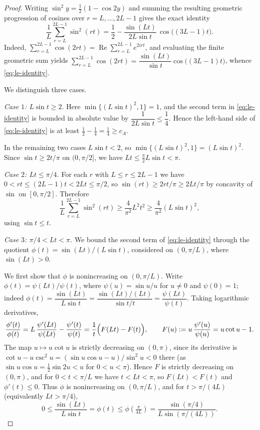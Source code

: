 \documentclass[11pt,reqno]{amsart}
\theoremstyle{plain}
\theoremstyle{definition}
\theoremstyle{remark}
\begin{document}
\begin{proof}
Writing $\sin^2 y=\tfrac12(1-\cos 2y)$ and summing the resulting geometric progression of cosines over $r=L,\dots,2L-1$ gives the exact identity
\begin{equation}\label{eq:le-identity}
\frac{1}{L}\sum_{r=L}^{2L-1}\sin^2(rt)
=\frac12-\frac{\sin(Lt)}{2L\sin t}\,\cos\bigl((3L-1)t\bigr).
\end{equation}
Indeed, $\sum_{r=L}^{2L-1}\cos(2rt)=\operatorname{Re}\sum_{r=L}^{2L-1}e^{2irt}$, and evaluating the finite geometric sum yields $\sum_{r=L}^{2L-1}\cos(2rt)=\dfrac{\sin(Lt)}{\sin t}\cos\bigl((3L-1)t\bigr)$, whence \eqref{eq:le-identity}.

We distinguish three cases.

\emph{Case $1$: $L\sin t\ge 2$.} Here $\min\{(L\sin t)^2,1\}=1$, and the second term in \eqref{eq:le-identity} is bounded in absolute value by $\dfrac{1}{2L\sin t}\le\dfrac14$. Hence the left-hand side of \eqref{eq:le-identity} is at least $\tfrac12-\tfrac14=\tfrac14\ge c_A$.

In the remaining two cases $L\sin t<2$, so $\min\{(L\sin t)^2,1\}=(L\sin t)^2$. Since $\sin t\ge 2t/\pi$ on $(0,\pi/2]$, we have $Lt\le\tfrac{\pi}{2}L\sin t<\pi$.

\emph{Case $2$: $Lt\le\pi/4$.} For each $r$ with $L\le r\le 2L-1$ we have $0<rt\le(2L-1)t<2Lt\le\pi/2$, so $\sin(rt)\ge 2rt/\pi\ge 2Lt/\pi$ by concavity of $\sin$ on $[0,\pi/2]$. Therefore
\[
\frac{1}{L}\sum_{r=L}^{2L-1}\sin^2(rt)\ge\frac{4}{\pi^2}L^2t^2\ge\frac{4}{\pi^2}(L\sin t)^2,
\]
using $\sin t\le t$.

\emph{Case $3$: $\pi/4<Lt<\pi$.} We bound the second term of \eqref{eq:le-identity} through the quotient $\phi(t)=\sin(Lt)/(L\sin t)$, considered on $(0,\pi/L)$, where $\sin(Lt)>0$.

We first show that $\phi$ is nonincreasing on $(0,\pi/L)$. Write $\phi(t)=\psi(Lt)/\psi(t)$, where $\psi(u)=\sin u/u$ for $u\ne 0$ and $\psi(0)=1$; indeed $\phi(t)=\dfrac{\sin(Lt)}{L\sin t}=\dfrac{\sin(Lt)/(Lt)}{\sin t/t}=\dfrac{\psi(Lt)}{\psi(t)}$. Taking logarithmic derivatives,
\[
\frac{\phi'(t)}{\phi(t)}=L\,\frac{\psi'(Lt)}{\psi(Lt)}-\frac{\psi'(t)}{\psi(t)}
=\frac1t\Bigl(F(Lt)-F(t)\Bigr),\qquad F(u):=u\,\frac{\psi'(u)}{\psi(u)}=u\cot u-1 .
\]
The map $u\mapsto u\cot u$ is strictly decreasing on $(0,\pi)$, since its derivative is $\cot u-u\csc^2 u=(\sin u\cos u-u)/\sin^2 u<0$ there (as $\sin u\cos u=\tfrac12\sin 2u<u$ for $0<u<\pi$). Hence $F$ is strictly decreasing on $(0,\pi)$, and for $0<t<\pi/L$ we have $t<Lt<\pi$, so $F(Lt)<F(t)$ and $\phi'(t)\le 0$. Thus $\phi$ is nonincreasing on $(0,\pi/L)$, and for $t>\pi/(4L)$ (equivalently $Lt>\pi/4$),
\[
0\le\frac{\sin(Lt)}{L\sin t}=\phi(t)\le\phi\!\left(\tfrac{\pi}{4L}\right)=\frac{\sin(\pi/4)}{L\sin(\pi/(4L))} .
\]


\end{proof}
\end{document}
